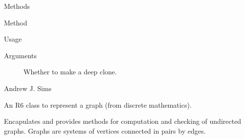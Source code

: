 \documentclass[a4paper]{book}
\begin{document}
\begin{Section}{Methods}
\begin{SubSection}{Method }
\begin{SubSubSection}{Usage}
\end{SubSubSection}


%
\begin{SubSubSection}{Arguments}

\begin{description}

\item[] Whether to make a deep clone.

\end{description}


\end{SubSubSection}

\end{SubSection}

\end{Section}
%
\begin{Author}\relax
Andrew J. Sims 
\end{Author}
%
\begin{Description}\relax
An R6 class to represent a graph (from discrete mathematics).
\end{Description}
%
\begin{Details}\relax
Encapulates and provides methods for computation and checking of undirected
graphs. Graphs are systems of vertices connected in pairs by edges.
\end{Details}
%
\end{document}
